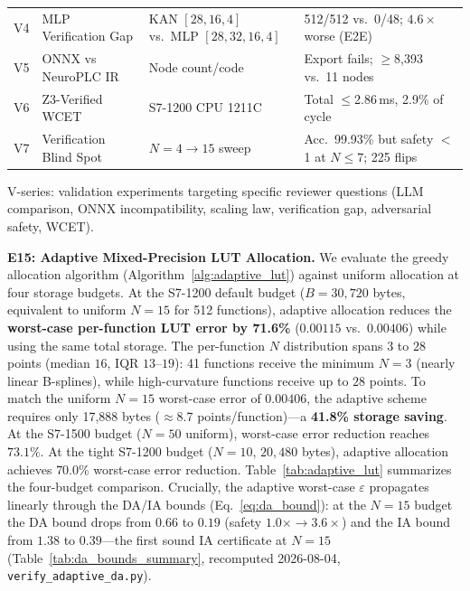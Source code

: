 \documentclass[journal,onecolumn]{IEEEtran}
\begin{document}
\begin{table}[tb]
\begin{tabular}{@{}p{0.7cm}p{4.6cm}p{3.6cm}p{4.9cm}@{}}
V4 & MLP Verification Gap      & KAN $[28,16,4]$ vs.\ MLP $[28,32,16,4]$ & 512/512 vs.\ 0/48; $4.6\times$ worse (E2E) \\
V5 & ONNX vs NeuroPLC IR    & Node count/code    & Export fails; $\geq$8,393 vs.\ 11 nodes \\
V6 & Z3-Verified WCET        & S7-1200 CPU 1211C   & Total $\leq$2.86\,ms, 2.9\% of cycle \\
V7 & Verification Blind Spot   & $N{=}4{\to}15$ sweep & Acc.\ 99.93\% but safety $<$1 at $N{\le}7$; 225 flips \\
\bottomrule
\end{tabular}
\vspace{2pt}
{\scriptsize V-series: validation experiments targeting specific reviewer
questions (LLM comparison, ONNX incompatibility, scaling law, verification
gap, adversarial safety, WCET).}
\end{table}

\noindent\textbf{E15: Adaptive Mixed-Precision LUT Allocation.}
We evaluate the greedy allocation algorithm (Algorithm~\ref{alg:adaptive_lut})
against uniform allocation at four storage budgets. At the S7-1200 default
budget ($B=30{,}720$ bytes, equivalent to uniform $N=15$ for 512 functions),
adaptive allocation reduces the \textbf{worst-case per-function LUT error by
71.6\%} ($0.00115$ vs.\ $0.00406$) while using the same total storage. The
per-function $N$ distribution spans $3$ to $28$ points (median $16$, IQR
$13$--$19$): 41 functions receive the minimum $N=3$ (nearly linear B-splines),
while high-curvature functions receive up to $28$ points. To match the
uniform $N=15$ worst-case error of $0.00406$, the adaptive scheme requires
only 17,888 bytes ($\approx$8.7 points/function)---a \textbf{41.8\% storage
saving}. At the S7-1500 budget ($N=50$ uniform), worst-case error reduction
reaches $73.1\%$. At the tight S7-1200 budget ($N=10$, $20{,}480$ bytes),
adaptive allocation achieves $70.0\%$ worst-case error reduction.
Table~\ref{tab:adaptive_lut} summarizes the four-budget comparison.
Crucially, the adaptive worst-case $\varepsilon$ propagates linearly
through the DA/IA bounds (Eq.~\ref{eq:da_bound}): at the $N{=}15$ budget
the DA bound drops from $0.66$ to $0.19$ (safety $1.0\times \to
3.6\times$) and the IA bound from $1.38$ to $0.39$---the first sound IA
certificate at $N{=}15$ (Table~\ref{tab:da_bounds_summary}, recomputed
2026-08-04, \texttt{verify\_adaptive\_da.py}).
\end{document}
